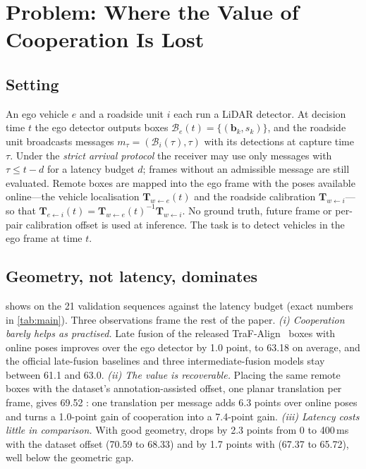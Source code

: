 \section{Problem: Where the Value of Cooperation Is Lost}
\label{sec:problem}

\subsection{Setting}
\label{sec:setting}
An ego vehicle $e$ and a roadside unit $i$ each run a LiDAR detector.
At decision time $t$ the ego detector outputs boxes $\mathcal B_e(t)=\{(\mathbf b_k,s_k)\}$, and the roadside unit broadcasts messages $m_\tau=(\mathcal B_i(\tau),\tau)$ with its detections at capture time $\tau$.
Under the \emph{strict arrival protocol} the receiver may use only messages with $\tau\le t-d$ for a latency budget $d$; frames without an admissible message are still evaluated.
Remote boxes are mapped into the ego frame with the poses available online---the vehicle localisation $\mathbf T_{w\leftarrow e}(t)$ and the roadside calibration $\mathbf T_{w\leftarrow i}$---so that $\mathbf T_{e\leftarrow i}(t)=\mathbf T_{w\leftarrow e}(t)^{-1}\mathbf T_{w\leftarrow i}$.
No ground truth, future frame or per-pair calibration offset is used at inference.
The task is to detect vehicles in the ego frame at time $t$.

\subsection{Geometry, not latency, dominates}
\label{sec:geometry}
 shows \apseven on the 21 validation sequences against the latency budget (exact numbers in \cref{tab:main}).
Three observations frame the rest of the paper.
\emph{(i) Cooperation barely helps as practised.}
Late fusion of the released TraF-Align~\cite{song2025trafalign} boxes with online poses improves \apseven over the ego detector by 1.0 point, to 63.18 on average, and the official late-fusion baselines and three intermediate-fusion models stay between 61.1 and 63.0.
\emph{(ii) The value is recoverable.}
Placing the same remote boxes with the dataset's annotation-assisted offset, one planar translation per frame, gives 69.52 \apseven: one translation per message adds 6.3 points over online poses and turns a 1.0-point gain of cooperation into a 7.4-point gain.
\emph{(iii) Latency costs little in comparison.}
With good geometry, \apseven drops by 2.3 points from 0 to 400\,ms with the dataset offset (70.59 to 68.33) and by 1.7 points with \method (67.37 to 65.72), well below the geometric gap.

